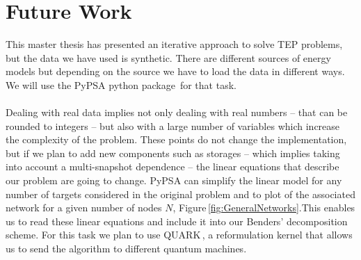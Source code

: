 \section{Future Work}
This master thesis has presented an iterative approach to solve TEP problems, but the data we have used is synthetic. There are different sources of energy models but depending on the source we have to load the data in different ways. We will use the PyPSA python package\,\cite{PyPSA-Eur:PyPSA-Eur} for that task.\\\\
Dealing with real data implies not only dealing with real numbers -- that can be rounded to integers -- but also with a large number of variables which increase the complexity of the problem. These points do not change the implementation, but if we plan to add new components such as storages -- which implies taking into account a multi-snapshot dependence -- the linear equations that describe our problem are going to change. PyPSA can simplify the linear model for any number of targets considered in the original problem and to plot of the associated network for a given number of nodes $N$, Figure\,\ref{fig:GeneralNetworks}.This enables us to read these linear equations and include it into our Benders' decomposition scheme. For this task we plan to use QUARK\,\cite{dlrsc2023quark}, a reformulation kernel that allows us to send the algorithm to different quantum machines.
